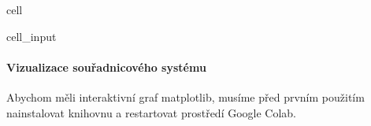 \documentclass[letterpaper,10pt,english]{jupyterBook}
\begin{document}
\begin{sphinxuseclass}{cell}\begin{sphinxVerbatimInput}

\begin{sphinxuseclass}{cell_input}
\begin{sphinxVerbatim}[commandchars=\\\{\}]
    
    
\end{sphinxVerbatim}

\end{sphinxuseclass}\end{sphinxVerbatimInput}

\end{sphinxuseclass}

\paragraph{Vizualizace souřadnicového systému}
\label{\detokenize{Prednasky/0_3_Sou_u0159adnicov_xe9_syst_xe9my:vizualizace-souradnicoveho-systemu}}
\sphinxAtStartPar
Abychom měli interaktivní graf matplotlib, musíme před prvním použitím nainstalovat knihovnu  a restartovat prostředí Google Colab.
\end{document}
